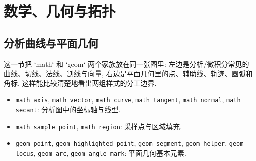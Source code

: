 \documentclass[a4paper,12pt,oneside]{maki-notes}
\begin{document}
\chapter{数学、几何与拓扑}

\section{分析曲线与平面几何}

这一节把 `math` 和 `geom` 两个家族放在同一张图里: 左边是分析/微积分常见的曲线、切线、法线、割线与向量, 右边是平面几何里的点、辅助线、轨迹、圆弧和角标. 这样能比较清楚地看出两组样式的分工边界.

\begin{styleinventory}
\begin{itemize}
\item \texttt{math axis}, \texttt{math vector}, \texttt{math curve}, \texttt{math tangent}, \texttt{math normal}, \texttt{math secant}: 分析图中的坐标轴与线型.
\item \texttt{math sample point}, \texttt{math region}: 采样点与区域填充.
\item \texttt{geom point}, \texttt{geom highlighted point}, \texttt{geom segment}, \texttt{geom helper}, \texttt{geom locus}, \texttt{geom arc}, \texttt{geom angle mark}: 平面几何基本元素.
\end{itemize}
\end{styleinventory}
\end{document}
